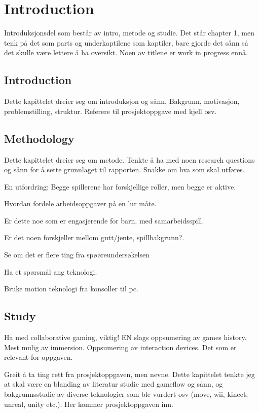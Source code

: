 \documentclass[11pt, a4paper]{report}
\begin{document}
	\chapter{Introduction}
	Introduksjonsdel som består av intro, metode og studie. Det står chapter 1, men tenk på det som parts og underkaptilene som kaptiler, bare gjorde det sånn så det skulle være lettere å ha oversikt. Noen av titlene er work in progress ennå.
	
	\section{Introduction}
	Dette kapittelet dreier seg om introduksjon og sånn. Bakgrunn, motivasjon, problemstilling, struktur. Referere til prosjektoppgave med kjell osv.
	
	\section{Methodology}
	Dette kapittelet dreier seg om metode. Tenkte å ha med noen research questions og sånn for å sette grunnlaget til rapporten. Snakke om hva som skal utføres.
	
	En utfordring: Begge spillerene har forskjellige roller, men begge er aktive.
	
	Hvordan fordele arbeidsoppgaver på en lur måte.
	
	Er dette noe som er engasjerende for barn, med samarbeidsspill.
	
	Er det noen forskjeller mellom gutt/jente, spillbakgrunn?.
	
	Se om det er flere ting fra spøøreundersøkelsen 
	
	Ha et spørsmål ang teknologi.
	
	Bruke motion teknologi fra konsoller til pc.
	
	\section{Study}
	Ha med collaborative gaming, viktig! EN slags oppsumering av games history. Mest mulig av immersion. Oppsumering av interaction devices. Det som er relevant for oppgaven.
	 
	Greit å ta ting rett fra prosjektoppgaven, men nevne.
	Dette kapittelet tenkte jeg at skal være en blanding av literatur studie med gameflow og sånn, og bakgrunnsstudie av diverse teknologier som ble vurdert osv (move, wii, kinect, unreal, unity etc.). Her kommer prosjektoppgaven inn.
	
\end{document}

